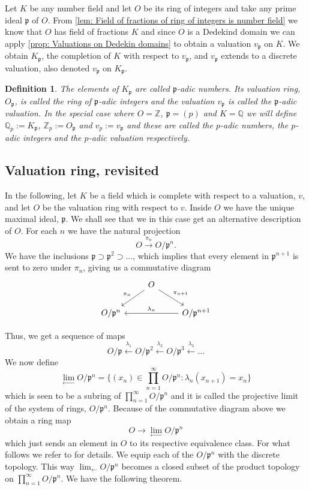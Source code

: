 \documentclass{article}
\newtheorem{definition}{Definition}[section]
\newcommand{\mfrak}[1]{\mathfrak{#1}}
\newcommand{\mbb}[1]{\mathbb{#1}}
\newcommand{\vp}{{v_{\mfrak p}}}
\numberwithin{equation}{section}
\begin{document}
Let $K$ be any number field and let $O$ be its ring of integers and take any prime ideal $\mfrak p$ of $O$. From 
\cref{lem: Field of fractions of ring of integers is number field} we know that $O$ has field of fractions $K$ and since $O$ is a Dedekind domain we can apply \cref{prop: Valuations on Dedekin domains} to obtain a valuation $\vp$ on $K$. We obtain $K_\mfrak p$, the completion of $K$ with respect to $\vp$, and $\vp$ extends to a discrete valuation, also denoted $\vp$ on $K_\mfrak p$.

\begin{definition}\label{def: P-adic numbers}
The elements of $K_\mfrak p$ are called $\mfrak p$-adic numbers. Its valuation ring, $O_\mfrak p$, is called the ring of $\mfrak p$-adic integers and the valuation $\vp$ is called the $\mfrak p$-adic valuation. In the special case where $O = \mbb Z$, $\mfrak p = (p)$ and $K = \mbb Q$ we will define $\mbb Q_p := K_\mfrak p$, $\mbb Z_p := O_\mfrak p$ and $v_p := \vp$ and these are called the $p$-adic numbers, the $p$-adic integers and the $p$-adic valuation respectively.
\end{definition}  

\subsection{Valuation ring, revisited}\label{sec: Revisit the valuation ring}
In the following, let $K$ be a field which is complete with respect to a valuation, $v$, and let $O$ be the valuation ring with respect to $v$. Inside $O$ we have the unique maximal ideal, $\mfrak p$. We shall see that we in this case get an alternative description of $O$. For each $n$ we have the natural projection
$$O \xrightarrow{\pi_n} O / \mfrak p^n.$$
We have the inclusions $\mfrak p \supset \mfrak p^2 \supset ...$, which implies that every element in $\mfrak p^{n+1}$ is sent to zero under $\pi_n$, giving us a commutative diagram
$$\begin{tikzcd}
        & O \arrow[ld, "\pi_{n}"'] \arrow[rd, "\pi_{n+1}"] & \\
        O / \mfrak p^{n} & & O / \mfrak p^{n+1} \arrow[ll, "\lambda_{n}"']
    \end{tikzcd}$$

Thus, we get a sequence of maps
$$O / \mfrak p \xleftarrow {\lambda_1} O / \mfrak p^2 \xleftarrow {\lambda_2} O / \mfrak p^3 \xleftarrow {\lambda_3} ...$$
We now define
$$\lim_{\leftarrow} O / \mfrak p^n = \{ (x_n) \in \prod_{n=1}^\infty O / \mfrak p^n : \lambda_n(x_{n+1}) = x_n \}$$
which is seen to be a subring of $\prod_{n=1}^\infty O / \mfrak p^n$ and it is called the projective limit of the system of rings, $O / \mfrak p^n$. Because of the commutative diagram above we obtain a ring map
$$O \to \lim_{\leftarrow} O / \mfrak p^n$$
which just sends an element in $O$ to its respective equivalence class. For what follows we refer to \citep[p. 128]{neukirch} for details. We equip each of the $O / \mfrak p^n$ with the discrete topology. This way $\lim_{\leftarrow} O / \mfrak p^n$ becomes a closed subset of the product topology on $\prod_{n=1}^\infty O / \mfrak p^n$. We have the following theorem.
\end{document}
